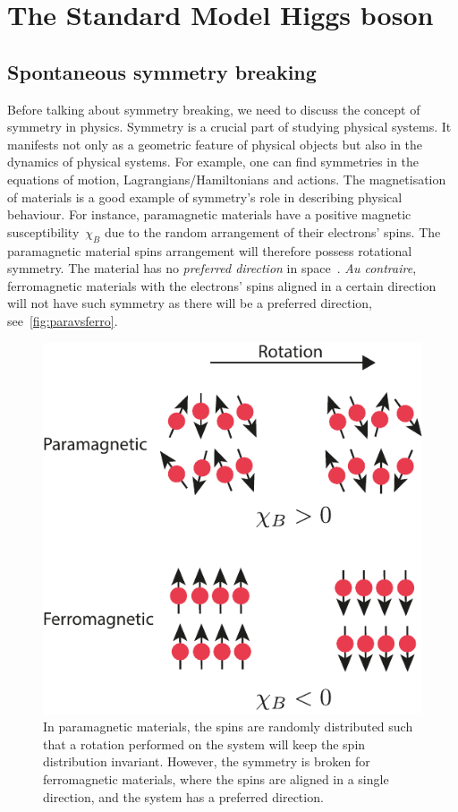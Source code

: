 \chapter{The Standard Model Higgs boson }\label{chap:HiggsSM}

\section{Spontaneous symmetry breaking \label{sec:ssb}}
\par Before talking about symmetry breaking, we need to discuss the concept of symmetry in physics. Symmetry is a crucial part of studying physical systems. It manifests not only as a geometric feature of physical objects but also in the dynamics of physical systems. For example, one can find symmetries in the equations of motion, Lagrangians/Hamiltonians and actions. The magnetisation of materials is a good example of symmetry's role in describing physical behaviour. For instance, {paramagnetic} materials have a positive magnetic susceptibility~$\chi_B$ due to the random arrangement of their electrons' spins.  The paramagnetic material spins arrangement will therefore possess rotational symmetry. The material has no \textit{ preferred direction} in space~\cite{minlos2000introduction}. \textit{Au contraire}, {ferromagnetic} materials with the electrons' spins aligned in a certain direction will not have such symmetry as there will be a preferred direction, see~\autoref{fig:paravsferro}. 
\begin{figure}[htpb!]
	\centering  
	\includegraphics[width=0.36\linewidth]{./figures/ferrvspara}
	\caption{In paramagnetic materials, the spins are randomly distributed such that a rotation performed on the system will keep the spin distribution invariant. However, the symmetry is broken for ferromagnetic materials, where the spins are aligned in a single direction, and the system has a preferred direction.}  \label{fig:paravsferro}
\end{figure}
